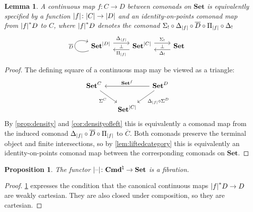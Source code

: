 \documentclass[11pt, oneside, article]{memoir}
\theoremstyle{plain}
\newtheorem{proposition}[theorem]{Proposition}
\newtheorem{lemma}[theorem]{Lemma}
\theoremstyle{definition}
\theoremstyle{remark}
\DeclarePairedDelimiter{\abs}{\lvert}{\rvert}
\newcommand{\dash}{{\mathord{\text{--}}}}
\newcommand{\bang}{\mathrm{!}}
\newcommand{\namedcat}[1]{\mathbf{#1}}
\newcommand{\Set}{\namedcat{Set}}
\newcommand{\Con}{\namedcat{Cmd}^\natural}
\newcommand{\ConO}{\Con}
\newcommand{\ConOSet}{\ConO}
\newcommand{\CoalgOn}[2]{{#2}^{#1}}
\newcommand{\CoalgSet}[1]{\CoalgOn{#1}{\Set}}
\newcommand{\clift}[1]{\overline{#1}}
\newcommand{\pts}[1]{{\abs{#1}}}
\newcommand{\one}[1]{\pts{#1}}
\newcommand{\carr}{\Sigma}
\newcommand{\reindex}[1]{\Delta_{#1}}
\newcommand{\slicel}{\Sigma_\bang}
\newcommand{\slicer}{\Delta_\bang}
\newcommand{\car}[1]{\carr^{#1}}
\newcommand{\carC}{\car{\cC}}
\newcommand{\carD}{\car{\cD}}
\newcommand{\con}[2]{{#1}^{#2}}
\newcommand{\cmnd}[1]{{#1}}
\newcommand{\cC}{\cmnd{C}}
\newcommand{\cD}{\cmnd{D}}
\newcommand{\CSet}{\CoalgSet{\cC}}
\newcommand{\DSet}{\CoalgSet{\cD}}
\newcommand{\SetpC}{\Set^\pts{\cC}}
\newcommand{\SetpD}{\Set^\pts{\cD}}
\begin{document}
\begin{lemma}\label{lem:coniscom}
  A continuous map $f \colon \cC \to \cD$ between comonads on $\Set$
  is equivalently specified by a function
  $\one{f} \colon \pts{\cC} \to \pts{\cD}$ and an identity-on-points
  comonad map from $\one{f}^*{\cD}$ to $\cC$, where $\one{f}^*{\cD}$ denotes
  the comonad $\slicel \circ \reindex{\one{f}} \circ \clift{\cD}
  \circ \Pi_{\one{f}} \circ \slicer$
  \[\begin{tikzcd}
      \SetpD & \SetpC & \Set
      \arrow["{\clift{\cD}}", from=1-1, to=1-1, loop, in=160, out=200, distance=10mm]
      \arrow["{\reindex{\one{f}}}", shift left=2, from=1-1, to=1-2]
      \arrow["{\Pi_{\one{f}}}", shift left=2, from=1-2, to=1-1]
      \arrow["\bot"{anchor=center}, draw=none, from=1-1, to=1-2]
      \arrow[""{name=0, anchor=center, inner sep=0}, "\slicel", shift left=2, from=1-2, to=1-3]
      \arrow["\bot"{anchor=center}, draw=none, from=1-2, to=1-3]
      \arrow[""{name=1, anchor=center, inner sep=0}, "\slicer", shift left=2, from=1-3, to=1-2]
      \arrow[draw=none, from=0, to=1]
    \end{tikzcd}
  \]
\end{lemma}
\begin{proof}
  The defining square of a continuous map may be viewed as a triangle:
  \[\begin{tikzcd}[column sep=15pt]
      \CSet && \DSet \\
      & \SetpC
      \arrow["\carC"', from=1-1, to=2-2]
      \arrow["{\con{\Set}{f}}"', from=1-3, to=1-1]
      \arrow["\reindex{\one{f}} \circ \carD", from=1-3, to=2-2]
    \end{tikzcd}\] By \cref{prop:density} and \cref{cor:densityofleft}
  this is equivalently a comonad map from the induced comonad
  $\reindex{\one{f}} \circ \clift{\cD} \circ \Pi_{\one{f}}$ to
  $\clift{\cC}$.  Both comonads preserve the terminal object and
  finite intersections, so by \cref{lem:liftedcategory} this is
  equivalently an identity-on-points comonad map between the
  corresponding comonads on $\Set$.
\end{proof}

\begin{proposition}\label{prop:fibration}
  The functor $\one{\dash} \colon \ConOSet \to \Set$ is a
  fibration.
\end{proposition}
\begin{proof}
  \cref{lem:coniscom} expresses the condition that the canonical
  continuous maps $\one{f}^*{\cD} \to \cD$ are weakly cartesian. They are
  also closed under composition, so they are cartesian.
\end{proof}
\end{document}
